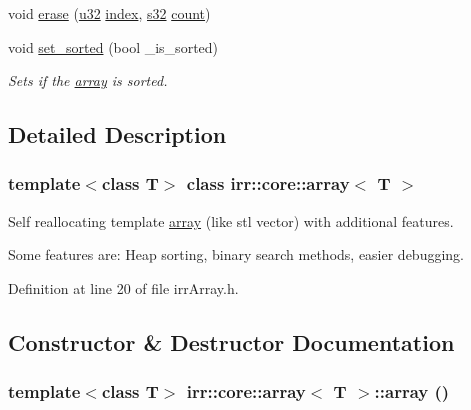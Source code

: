 \begin{CompactItemize}
\item 
void \hyperlink{classirr_1_1core_1_1array_2b749c99e727919254f1f0593fbd30ed}{erase} (\hyperlink{namespaceirr_0416a53257075833e7002efd0a18e804}{u32} \hyperlink{glext__bak_8h_57f14e05b1900f16a2da82ade47d0c6d}{index}, \hyperlink{namespaceirr_c66849b7a6ed16e30ebede579f9b47c6}{s32} \hyperlink{wglext_8h_98d18d6b4e3ba4ed266c6fb54c839d70}{count})
\item 
void \hyperlink{classirr_1_1core_1_1array_5322149d943e3a5b23dff3000f825a01}{set\_\-sorted} (bool \_\-is\_\-sorted)
\begin{CompactList}\small\item\em Sets if the \hyperlink{classirr_1_1core_1_1array}{array} is sorted. \item\end{CompactList}\end{CompactItemize}


\subsection{Detailed Description}
\subsubsection*{template$<$class T$>$ class irr::core::array$<$ T $>$}

Self reallocating template \hyperlink{classirr_1_1core_1_1array}{array} (like stl vector) with additional features. 

Some features are: Heap sorting, binary search methods, easier debugging. 

Definition at line 20 of file irrArray.h.

\subsection{Constructor \& Destructor Documentation}
\hypertarget{classirr_1_1core_1_1array_d078049b519999658db99cd7838dc034}{
\subsubsection[{array}]{\setlength{\rightskip}{0pt plus 5cm}template$<$class T$>$ {\bf irr::core::array}$<$ T $>$::{\bf array} ()}}
\label{classirr_1_1core_1_1array_d078049b519999658db99cd7838dc034}




